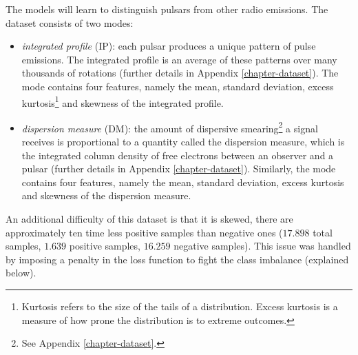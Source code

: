 The models will learn to distinguish pulsars from other radio emissions. The dataset consists of two modes:
\begin{itemize}
\item \textit{integrated profile} (IP): each pulsar produces a unique pattern of pulse emissions. The integrated profile is an average of these patterns over many thousands of rotations (further details in Appendix \ref{chapter-dataset}). The mode contains four features, namely the mean, standard deviation, excess kurtosis\footnote{Kurtosis refers to the size of the tails of a distribution. Excess kurtosis is a measure of how prone the distribution is to extreme outcomes.} and skewness of the integrated profile.
\item \textit{dispersion measure} (DM): the amount of dispersive smearing\footnote{See Appendix \ref{chapter-dataset}.} a signal receives is proportional to a quantity called the dispersion measure, which is the integrated column density of free electrons between an observer and a pulsar (further details in Appendix \ref{chapter-dataset}). Similarly, the mode contains four features, namely the mean, standard deviation, excess kurtosis and skewness of the dispersion measure.
\end{itemize}

An additional difficulty of this dataset is that it is skewed, there are approximately ten time less positive samples than negative ones ($17.898$ total samples, $1.639$ positive samples, $16.259$ negative samples). This issue was handled by imposing a penalty in the loss function to fight the class imbalance (explained below).


